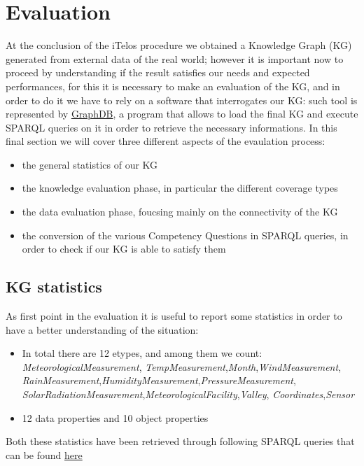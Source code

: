 \section{Evaluation}
At the conclusion of the iTelos procedure we obtained a
Knowledge Graph (KG) generated from external data of the real world;
however it is important now to proceed by understanding
if the result satisfies our needs and expected performances,
for this it is necessary to make an evaluation of the KG,
and in order to do it we have to rely on a software that
interrogates our KG: such tool
is represented by \href{https://www.ontotext.com/products/graphdb/}{GraphDB}, a program that allows
to load the final KG and execute SPARQL queries on it in order
to retrieve the necessary informations. In this final
section we will cover three different aspects of the 
evaulation process:
\begin{itemize}
	\item the general statistics of our KG
	\item the knowledge evaluation phase,
		in particular the different coverage types
	\item the data evaluation phase, foucsing
		mainly on the connectivity of the KG
	\item the conversion of the various
		Competency Questions in SPARQL queries,
		in order to check if our KG is able to
		satisfy them
\end{itemize}

\subsection{KG statistics}

As first point in the evaluation it is useful to report some
statistics in order to have a better understanding of the situation:

\begin{itemize}
	\item In total there are 12 etypes, and among them we count: \textit{MeteorologicalMeasurement},
		\textit{TempMeasurement},\textit{Month},\textit{WindMeasurement},
		\textit{RainMeasurement},\textit{HumidityMeasurement},\textit{PressureMeasurement},
		\textit{SolarRadiationMeasurement},\textit{MeteorologicalFacility},\textit{Valley},
		\textit{Coordinates},\textit{Sensor}
	\item 12 data properties and 10 object properties		
\end{itemize}

Both these statistics have been retrieved through following SPARQL queries
that can be found \href{https://github.com/zerise000/KG_Project2025_ClimateChange/tree/main/Evaluation/KG_statistics}{here}

